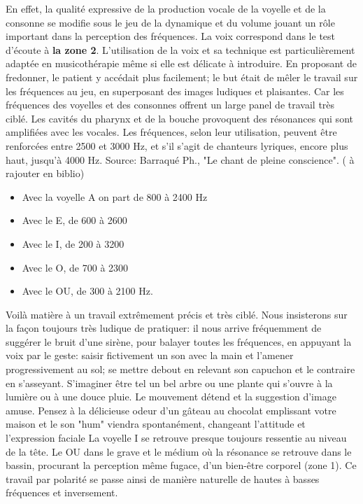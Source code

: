 En effet, la qualité expressive de la production vocale de la voyelle et de la consonne se modifie sous le 
jeu de la 
dynamique et du volume  jouant  un rôle important dans la perception des fréquences.
La voix correspond dans le test d'écoute à \textbf{la zone 2}.  L'utilisation de la voix et sa 
technique est particulièrement adaptée en 
musicothérapie même si elle est délicate à  introduire. %
 En proposant de fredonner, le patient y accédait plus 
 facilement;  le but était de mêler le travail sur les fréquences au jeu, en superposant  des images 
 ludiques et plaisantes. Car les fréquences des voyelles et des consonnes offrent un large panel de 
 travail très ciblé. Les cavités du 
pharynx et de la bouche provoquent des résonances qui sont amplifiées avec les vocales. Les 
fréquences, selon leur utilisation, peuvent être renforcées entre 2500 et 3000 Hz, et s'il s'agit de 
chanteurs lyriques, encore plus haut, jusqu'à 4000 Hz. %
Source: Barraqué Ph., "Le chant de pleine conscience". ( à rajouter en biblio)
\begin{itemize}
	\item Avec la voyelle A on part de 800  à 2400 Hz
	\item Avec le  E, de 600 à 2600
	\item Avec le I, de 200 à 3200
	\item Avec le O, de 700 à 2300 
	\item Avec le OU, de 300 à 2100 Hz. 
\end{itemize}

Voilà matière à un travail extrêmement précis et très ciblé. 
Nous insisterons  sur la façon  toujours très ludique de pratiquer:  il nous arrive fréquemment 
de suggérer le bruit d'une sirène, pour balayer toutes les fréquences, en appuyant la voix par le geste: 
saisir fictivement un son avec la main et l'amener progressivement au sol;  se mettre debout en relevant 
son 
capuchon et le 
contraire en s'asseyant. S'imaginer être tel un bel 
arbre ou une plante qui s'ouvre à la lumière ou à une douce pluie.
Le mouvement détend et la suggestion d'image amuse. Pensez à la délicieuse odeur d'un gâteau au 
chocolat emplissant  votre maison et le son "hum" viendra spontanément, changeant l'attitude et 
l'expression faciale 
La voyelle I se retrouve presque toujours ressentie au niveau de la tête.
Le OU dans le grave et le médium où la résonance se retrouve dans le bassin, procurant la perception 
même fugace, d'un bien-être corporel (zone 1).
Ce travail par polarité se passe ainsi de manière naturelle de hautes à basses fréquences et inversement. 



